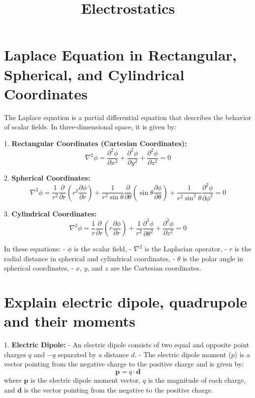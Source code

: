 \documentclass[a4paper, 12pt]{article}
\title{Electrostatics}
\author{}
\begin{document}
\maketitle
\section*{Laplace Equation in Rectangular, Spherical, and Cylindrical Coordinates}
The Laplace equation is a partial differential equation that describes the behavior of scalar fields. In three-dimensional space, it is given by:

1. \textbf{Rectangular Coordinates (Cartesian Coordinates):}
   \[ \nabla^2 \phi = \frac{\partial^2 \phi}{\partial x^2} + \frac{\partial^2 \phi}{\partial y^2} + \frac{\partial^2 \phi}{\partial z^2} = 0 \]

2. \textbf{Spherical Coordinates:}
   \[ \nabla^2 \phi = \frac{1}{r^2} \frac{\partial}{\partial r} \left(r^2 \frac{\partial \phi}{\partial r}\right) + \frac{1}{r^2 \sin \theta} \frac{\partial}{\partial \theta} \left(\sin \theta \frac{\partial \phi}{\partial \theta}\right) + \frac{1}{r^2 \sin^2 \theta} \frac{\partial^2 \phi}{\partial \phi^2} = 0 \]

3. \textbf{Cylindrical Coordinates:}
   \[ \nabla^2 \phi = \frac{1}{r} \frac{\partial}{\partial r} \left(r \frac{\partial \phi}{\partial r}\right) + \frac{1}{r^2} \frac{\partial^2 \phi}{\partial \theta^2} + \frac{\partial^2 \phi}{\partial z^2} = 0 \]

In these equations:
- \(\phi\) is the scalar field,
- \(\nabla^2\) is the Laplacian operator,
- \(r\) is the radial distance in spherical and cylindrical coordinates,
- \(\theta\) is the polar angle in spherical coordinates,
- \(x\), \(y\), and \(z\) are the Cartesian coordinates.


\section*{Explain electric dipole, quadrupole and their moments}

1. {\bf Electric Dipole:}
   - An electric dipole consists of two equal and opposite point charges \(q\) and \(-q\) separated by a distance \(d\).
   - The electric dipole moment (\(p\)) is a vector pointing from the negative charge to the positive charge and is given by:
     \[ \mathbf{p} = q \cdot \mathbf{d} \]
     where \(\mathbf{p}\) is the electric dipole moment vector, \(q\) is the magnitude of each charge, and \(\mathbf{d}\) is the vector pointing from the negative to the positive charge.
\end{document}
